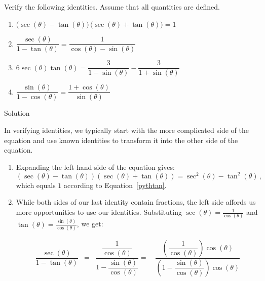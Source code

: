 \begin{example}
\label{idornotex1} Verify the following identities. Assume that all quantities are defined.

\begin{multicols}{2}


\begin{enumerate}

\item  $\Big(\sec(\theta) - \tan(\theta)\big)\,\big(\sec(\theta) + \tan(\theta)\Big) = 1$ 

\item  $\dfrac{\sec(\theta)}{1 - \tan(\theta)} = \dfrac{1}{\cos(\theta) - \sin(\theta)}$


\item  $6\sec(\theta) \tan(\theta) = \dfrac{3}{1-\sin(\theta)} - \dfrac{3}{1 + \sin(\theta)}$

\item  \label{pythconjex} $\dfrac{\sin(\theta)}{1 - \cos(\theta)} = \dfrac{1 + \cos(\theta)}{\sin(\theta)}$

\end{enumerate}

\end{multicols}


Solution 

  In verifying identities, we typically start with the more complicated side of the equation and use known identities to transform it into the other side of the equation. 

\begin{enumerate} 

\item Expanding the left hand side of the equation gives:  
$$
\left(\sec(\theta) - \tan(\theta)\right) \left(\sec(\theta) + \tan(\theta)\right) = \sec^{2}(\theta) - \tan^{2}(\theta)\,,$$ which equals $1$ according to Equation~\eqref{pythtan}.


\item  While both sides of our last identity contain fractions, the left side affords us more opportunities to use our identities. Substituting $\sec(\theta) = \frac{1}{\cos(\theta)}$ and $\tan(\theta) = \frac{\sin(\theta)}{\cos(\theta)}$, we get:


\[ \begin{array}{rcl} 
\dfrac{\sec(\theta)}{1 - \tan(\theta)} & = & \dfrac{ \dfrac{1}{\cos(\theta)}}{1 - \dfrac{\sin(\theta)}{\cos(\theta)}}=\quad \dfrac{\left( \dfrac{1}{\cos(\theta)} \right) \cos(\theta)}{\left(1 - \dfrac{\sin(\theta)}{\cos(\theta)}\right)\cos(\theta)}\\ [.4in] %


\end{array}\]
\end{enumerate}
\end{example}
